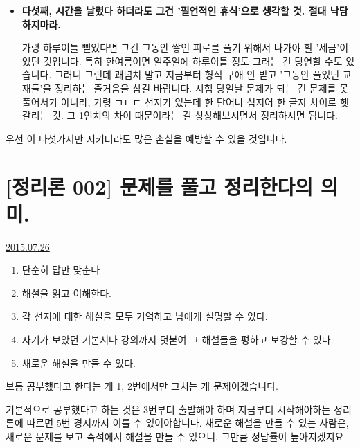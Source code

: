 \begin{itemize}
    \item  \textbf{다섯째, 시간을 날렸다 하더라도 그건 '필연적인 휴식'으로 생각할 것. 절대 낙담하지마라.}
    \vspace{5mm}

    가령 하루이틀 뻗었다면 그건 그동안 쌓인 피로를 풀기 위해서 나가야 할 '세금'이었던 것입니다.
    특히 한여름이면 일주일에 하루이틀 정도 그러는 건 당연할 수도 있습니다.
    그러니 그런데 괘념치 말고 지금부터 형식 구애 안 받고 '그동안 풀었던 교재들'을 정리하는 즐거움을 삼길 바랍니다.
    시험 당일날 문제가 되는 건 문제를 못 풀어서가 아니라, 가령 ㄱㄴㄷ 선지가 있는데 한 단어나 심지어 한 글자 차이로 헷갈리는 것.
    그 1인치의 차이 때문이라는 걸 상상해보시면서 정리하시면 됩니다.
    \vspace{5mm}

\end{itemize}
우선 이 다섯가지만 지키더라도 많은 손실을 예방할 수 있을 것입니다.
\vspace{5mm}






\section{[정리론 002] 문제를 풀고 정리한다의 의미.}
\href{https://www.kockoc.com/Apoc/217718}{2015.07.26}

\vspace{5mm}
\begin{enumerate}
    \item 단순히 답만 맞춘다
    \item 해설을 읽고 이해한다.
    \item 각 선지에 대한 해설을 모두 기억하고 남에게 설명할 수 있다.
    \item 자기가 보았던 기본서나 강의까지 덧붙여 그 해설들을 평하고 보강할 수 있다.
    \item 새로운 해설을 만들 수 있다.
\end{enumerate}
\vspace{5mm}

보통 공부했다고 한다는 게 1, 2번에서만 그치는 게 문제이겠습니다.
\vspace{5mm}

기본적으로 공부했다고 하는 것은 3번부터 출발해야 하며
지금부터 시작해야하는 정리론에 따르면 5번 경지까지 이를 수 있어야합니다.
새로운 해설을 만들 수 있는 사람은, 새로운 문제를 보고 즉석에서 해설을 만들 수 있으니, 그만큼 정답률이 높아지겠지요.
\vspace{5mm}

